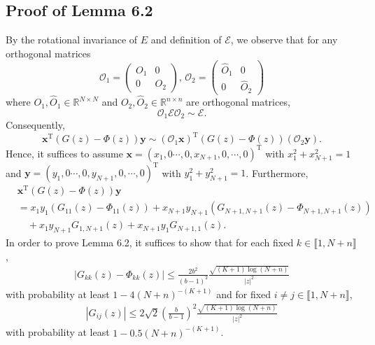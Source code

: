 \documentclass[reqno]{amsart}
\newcommand{\T}{\mathrm{T}}
\theoremstyle{plain}
\theoremstyle{definition}
\begin{document}
\subsection{Proof of Lemma 6.2}\label{app:lem:iso}
By the rotational invariance of $E$ and definition of $\mathcal E$, we observe that for any orthogonal matrices $$\mathcal O_1 =\begin{pmatrix}
O_1 & 0\\
0& O_2
\end{pmatrix}, \,
\mathcal O_2 =\begin{pmatrix}
\widehat O_1 & 0\\
0& \widehat O_2
\end{pmatrix}
$$
where $O_1,\widehat O_1 \in \mathbb R^{N\times N}$ and $O_2,\widehat O_2 \in \mathbb R^{n \times n}$ are orthogonal matrices, $$\mathcal O_1 \mathcal E \mathcal O_2 \sim \mathcal E.$$ Consequently,
$$\mathbf x^\T \left(G(z)-\Phi(z) \right) \mathbf y \sim ( \mathcal O_1 \mathbf x)^\T \left(G(z)-\Phi(z) \right) (\mathcal O_2\mathbf y).$$ Hence, it suffices to assume $\mathbf x = (x_1, 0\cdots,0,x_{N+1},0,\cdots,0)^\T$ with $x_1^2 + x_{N+1}^2=1$ and $\mathbf y = (y_1, 0\cdots,0,y_{N+1},0,\cdots,0)^\T$ with $y_1^2 + y_{N+1}^2=1$. Furthermore, 
\begin{align}\label{eq:reduceG}
&\mathbf x^\T \left(G(z)-\Phi(z) \right) \mathbf y \nonumber\\
&= x_1 y_1 (G_{11}(z)-\Phi_{11}(z)) + x_{N+1} y_{N+1}  (G_{N+1,N+1}(z)-\Phi_{N+1,N+1}(z))\nonumber \\ 
&\quad+x_1 y_{N+1} G_{1,N+1}(z) +  x_{N+1} y_1 G_{N+1,1}(z).
\end{align}
In order to prove Lemma 6.2,  it suffices to show that for each fixed $k \in \llbracket 1, N+n\rrbracket$,
\begin{align}\label{eq:Gkk}
\left| G_{kk}(z) - \Phi_{kk}(z) \right| \leq \frac{2b^2}{(b-1)^2}\frac{ \sqrt{(K+1)\log (N+n)}}{|z|^2} 
\end{align}
with probability at least $1 - 4(N+n)^{-(K+1)}$ and for fixed $i\neq j\in \llbracket 1, N+n\rrbracket$,
\begin{align}\label{eq:Gij}
  |G_{ij}(z)| \leq 2\sqrt{2}\left(\frac{b}{b-1} \right)^2\frac{  \sqrt{(K+1)\log (N+n)}}{ |z|^2}
  \end{align}
with probability at least $1 - 0.5 (N+n)^{-(K+1)}$. 

\end{document}

